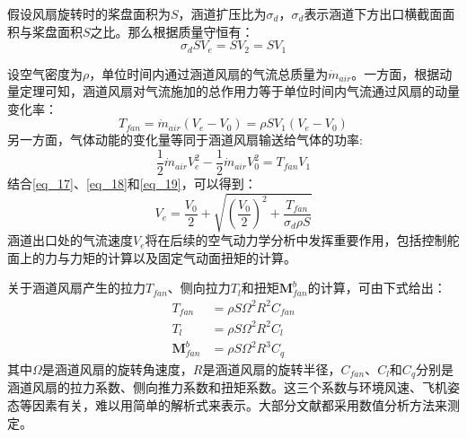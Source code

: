 假设风扇旋转时的桨盘面积为$S$，涵道扩压比为$\sigma_d$，$\sigma_d$表示涵道下方出口横截面面积与桨盘面积$S$之比。那么根据质量守恒有：
\begin{equation}
    \sigma_dSV_e=SV_2=SV_1
    \label{eq_17}
\end{equation}

设空气密度为$\rho$，单位时间内通过涵道风扇的气流总质量为$\dot{m}_{air}$。一方面，根据动量定理可知，涵道风扇对气流施加的总作用力等于单位时间内气流通过风扇的动量变化率：
\begin{equation}
    T_{fan}=\dot{m}_{air}(V_e-V_0)=\rho S V_1(V_e-V_0)
    \label{eq_18}
\end{equation}
另一方面，气体动能的变化量等同于涵道风扇输送给气体的功率:
\begin{equation}
    \frac{1}{2}\dot{m}_{air}V_e^2-\frac{1}{2}\dot{m}_{air}V_0^2=T_{fan}V_1
    \label{eq_19}
\end{equation}
结合\eqref{eq_17}、\eqref{eq_18}和\eqref{eq_19}，可以得到\cite{pereiraHoverWindtunnelTesting2008}：
\begin{equation}
    V_e=\frac{V_0}{2}+\sqrt{\left(\frac{V_0}{2}\right)^2+\frac{T_{fan}}{\sigma_d\rho S}}    \label{eq_20}
\end{equation}
涵道出口处的气流速度$V_e$将在后续的空气动力学分析中发挥重要作用，包括控制舵面上的力与力矩的计算以及固定气动面扭矩的计算。

关于涵道风扇产生的拉力$T_{fan}$、侧向拉力$T_{l}$和扭矩$\boldsymbol{M}_{fan}^b$的计算，可由下式给出\cite{luoNumericalAnalysisWind2024a}：
\begin{equation}
    \begin{aligned}
        T_{fan}&=\rho S \Omega^2R^2 C_{fan}\\
        T_{l}&=\rho S \Omega^2R^2 C_{l}\\
        \boldsymbol{M}_{fan}^b&=\rho S \Omega^2 R^3C_{q}
    \end{aligned}
    \label{eq_21}
\end{equation}
其中$\Omega$是涵道风扇的旋转角速度，$R$是涵道风扇的旋转半径，$C_{fan}$、$C_{l}$和$C_{q}$分别是涵道风扇的拉力系数、侧向推力系数和扭矩系数。这三个系数与环境风速、飞机姿态等因素有关，难以用简单的解析式来表示。大部分文献都采用数值分析方法来测定\cite{iiiNondimensionalModelingDuctedFan2012,choiStaticAnalysisSmall2012,luoNumericalAnalysisWind2024a}。

